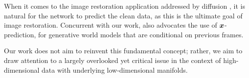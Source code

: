 When it comes to the image restoration application addressed by diffusion \cite{delbracio2023inversion,xie2023diffusion,milanfar2025denoising}, it is natural for the network to predict the clean data, as this is the ultimate goal of image restoration. 
Concurrent with our work, \cite{hafner2025training} also advocates the use of $\bm{x}$-prediction, for generative world models that are conditional on previous frames.

Our work does not aim to reinvent this fundamental concept; rather, we aim to draw attention to a largely overlooked yet critical issue in the context of high-dimensional data with underlying low-dimensional manifolds.





